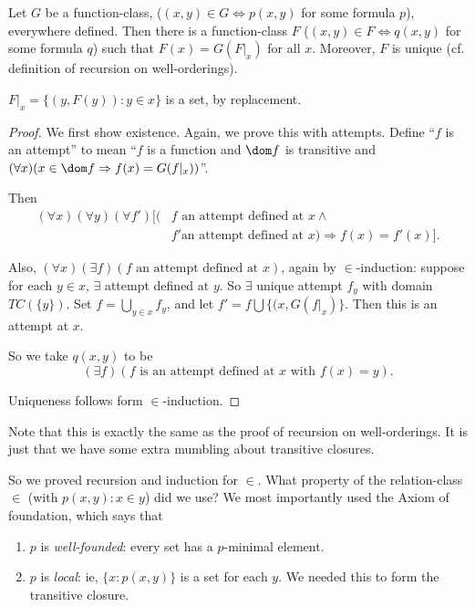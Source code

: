 \documentclass[a4paper]{article}
\begin{document}
\begin{thm}
  Let $G$ be a function-class, ($(x, y)\in G\Leftrightarrow p(x, y)$ for some formula $p$), everywhere defined. Then there is a function-class $F$ ($(x, y)\in F\Leftrightarrow q(x, y)$ for some formula $q$) such that $F(x) = G(F|_x)$ for all $x$. Moreover, $F$ is unique (cf. definition of recursion on well-orderings).
\end{thm}
\note $F|_x = \{(y, F(y)): y\in x\}$ is a set, by replacement.

\begin{proof}
  We first show existence. Again, we prove this with attempts. Define ``$f$ is an attempt'' to mean ``$f$ is a function and $\dom f$ is transitive and $(\forall x)(x\in \dom f \Rightarrow  f(x) = G(f|_x))$''.

  Then 
  \begin{align*}
    (\forall x)(\forall y)(\forall f')[(&f\text{ an attempt defined at }x\wedge\\
    & f'\text{an attempt defined at $x$}) \Rightarrow f(x) = f'(x)].
  \end{align*}

  Also, $(\forall x)(\exists f)(f\text{ an attempt defined at }x)$, again by $\in$-induction: suppose for each $y\in x$, $\exists$ attempt defined at $y$. So $\exists$ unique attempt $f_y$ with domain $TC(\{y\})$. Set $f = \bigcup_{y\in x}f_y$, and let $f' = f\bigcup \{(x, G(f|_x)\}$. Then this is an attempt at $x$.

  So we take $q(x, y)$ to be
  \[
    (\exists f)(f\text{ is an attempt defined at }x\text{ with }f(x) = y).
  \]

  Uniqueness follows form $\in$-induction.
\end{proof}
Note that this is exactly the same as the proof of recursion on well-orderings. It is just that we have some extra mumbling about transitive closures.

So we proved recursion and induction for $\in$. What property of the relation-class $\in$ (with $p(x, y): x\in y$) did we use? We most importantly used the Axiom of foundation, which says that
\begin{enumerate}
  \item $p$ is \emph{well-founded}: every set has a $p$-minimal element.
  \item $p$ is \emph{local}: ie, $\{x: p(x, y)\}$ is a set for each $y$. We needed this to form the transitive closure.
\end{enumerate}
\end{document}
